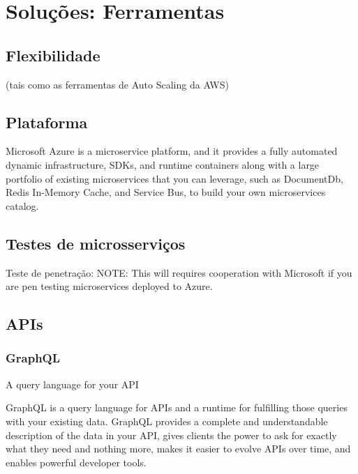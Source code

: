 \chapter{Soluções: Ferramentas}\label{chapter-solucoes}


\section{Flexibilidade}
(tais como as ferramentas de Auto Scaling da AWS)

\section{Plataforma}
Microsoft Azure is a microservice platform, and it provides a fully automated dynamic infrastructure, SDKs, and runtime containers along with a large portfolio of existing microservices that you can leverage, such as DocumentDb, Redis In-Memory Cache, and Service Bus, to build your own microservices catalog. \cite{Familiar2015}

\section{Testes de microsserviços}

Teste de penetração: NOTE: This will requires cooperation with Microsoft if you are pen testing microservices deployed to Azure.

\section{APIs}

\subsection{GraphQL}

A query language for your API

GraphQL is a query language for APIs and a runtime for fulfilling those queries with your existing data. GraphQL provides a complete and understandable description of the data in your API, gives clients the power to ask for exactly what they need and nothing more, makes it easier to evolve APIs over time, and enables powerful developer tools. \cite{GraphQL-site}

